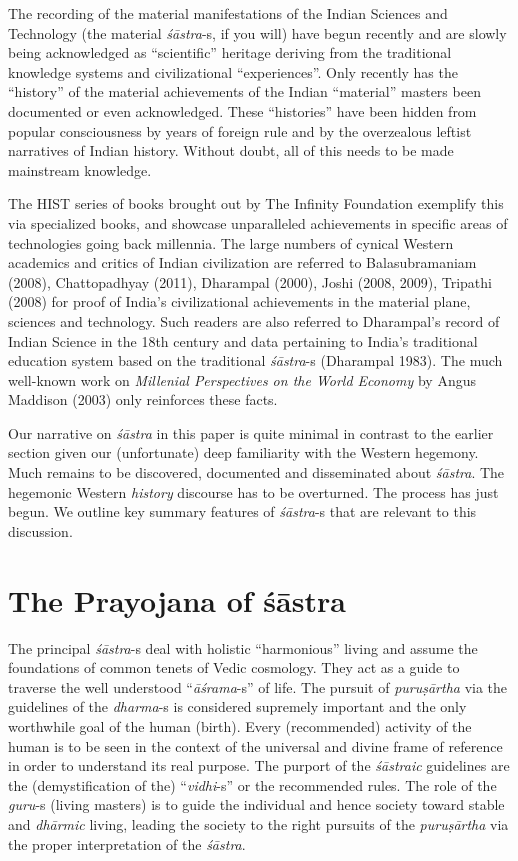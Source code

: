 The recording of the material manifestations of the Indian Sciences and Technology (the material \textit{śāstra}-s, if you will) have begun recently and are slowly being acknowledged as “scientific” heritage deriving from the traditional knowledge systems and civilizational “experiences”. Only recently has the “history” of the material achievements of the Indian “material” masters been documented or even acknowledged. These “histories” have been hidden from popular consciousness by years of foreign rule and by the overzealous leftist narratives of Indian history. Without doubt, all of this needs to be made mainstream knowledge.

The HIST series of books brought out by The Infinity Foundation exemplify this via specialized books, and showcase unparalleled achievements in specific areas of technologies going back millennia. The large numbers of cynical Western academics and critics of Indian civilization are referred to Balasubramaniam (2008), Chattopadhyay (2011), Dharampal (2000), Joshi (2008, 2009), Tripathi (2008) for proof of India’s civilizational achievements in the material plane, sciences and technology. Such readers are also referred to Dharampal’s record of Indian Science in the 18th century and data pertaining to India’s traditional education system based on the traditional \textit{śāstra}-s (Dharampal 1983). The much well-known work on \textit{Millenial Perspectives on the World Economy} by Angus Maddison (2003) only reinforces these facts.

Our narrative on \textit{śāstra} in this paper is quite minimal in contrast to the earlier section given our (unfortunate) deep familiarity with the Western hegemony. Much remains to be discovered, documented and disseminated about \textit{śāstra}. The hegemonic Western \textit{history} discourse has to be overturned. The process has just begun. We outline key summary features of \textit{śāstra}-s that are relevant to this discussion.


\section*{The Prayojana of śāstra}

The principal \textit{śāstra}-s deal with holistic “harmonious” living and assume the foundations of common tenets of Vedic cosmology. They act as a guide to traverse the well understood “\textit{āśrama}-s” of life. The pursuit of \textit{puruṣārtha} via the guidelines of the \textit{dharma}-s is considered supremely important and the only worthwhile goal of the human (birth). Every (recommended) activity of the human is to be seen in the context of the universal and divine frame of reference in order to understand its real purpose. The purport of the \textit{śāstraic} guidelines are the (demystification of the) “\textit{vidhi}-s” or the recommended rules. The role of the \textit{guru}-s (living masters) is to guide the individual and hence society toward stable and \textit{dhārmic} living, leading the society to the right pursuits of the \textit{puruṣārtha} via the proper interpretation of the \textit{śāstra}.

